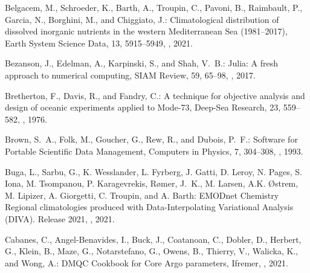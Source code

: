 \documentclass[essd, manuscript]{copernicus}
\begin{document}
\begin{thebibliography}{52}
Belgacem, M., Schroeder, K., Barth, A., Troupin, C., Pavoni, B., Raimbault, P.,
  Garcia, N., Borghini, M., and Chiggiato, J.: {Climatological distribution of
  dissolved inorganic nutrients in the western Mediterranean Sea
  (1981–2017)}, Earth System Science Data, 13, 5915–5949,
  , 2021.

Bezanson, J., Edelman, A., Karpinski, S., and Shah, V.~B.: Julia: A fresh
  approach to numerical computing, SIAM {R}eview, 59, 65--98,
  , 2017.

Bretherton, F., Davis, R., and Fandry, C.: {A technique for objective analysis
  and design of oceanic experiments applied to Mode-73}, Deep-Sea Research, 23,
  559--582, , 1976.

Brown, S.~A., Folk, M., Goucher, G., Rew, R., and Dubois, P.~F.: {Software for
  Portable Scientific Data Management}, Computers in Physics, 7, 304–308,
  , 1993.

Buga, L., Sarbu, G., {K. Wesslander}, {L. Fyrberg}, {J. Gatti}, {D. Leroy}, {N.
  Pages}, {S. Iona}, {M. Tsompanou}, {P. Karagevrekis}, Rømer, J.~K., {M.
  Larsen}, {A.K. Østrem}, {M. Lipizer}, {A. Giorgetti}, {C. Troupin}, and {A.
  Barth}: {EMODnet Chemistry Regional climatologies produced with
  Data-Interpolating Variational Analysis (DIVA). Release 2021},
  , 2021.

Cabanes, C., Angel-Benavides, I., Buck, J., Coatanoan, C., Dobler, D., Herbert,
  G., Klein, B., Maze, G., Notarstefano, G., Owens, B., Thierry, V., Walicka,
  K., and Wong, A.: DMQC Cookbook for Core Argo parameters, Ifremer,
  , 2021.


\end{thebibliography}
\end{document}
